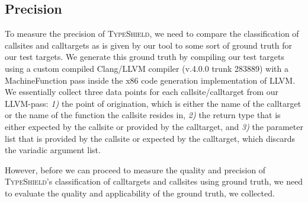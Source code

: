 \subsection{Precision}
\label{section:typeshieldprecision}

To measure the precision of \textsc{TypeShield}, we need to compare the classification of callsites and calltargets as is given by our tool to some sort of ground truth for our test targets. We generate this ground truth by compiling our test targets using a 
custom compiled Clang/LLVM compiler (v.4.0.0 trunk 283889) with a MachineFunction pass inside the x86 code generation implementation of LLVM. We essentially collect three data points for each callsite/calltarget from our LLVM-pass:
\textit{1)} the point of origination, which is either the name of the calltarget or the name of the function the callsite resides in, 
\textit{2)} the return type that is either expected by the callsite or provided by the calltarget, and 
\textit{3)} the parameter list that is provided by the callsite or expected by the calltarget, which discards the variadic argument list.

However, before we can proceed to measure the quality and precision of \textsc{TypeShield}'s classification of calltargets and callsites using ground truth, we need to evaluate the quality and applicability of the ground truth, we collected.


